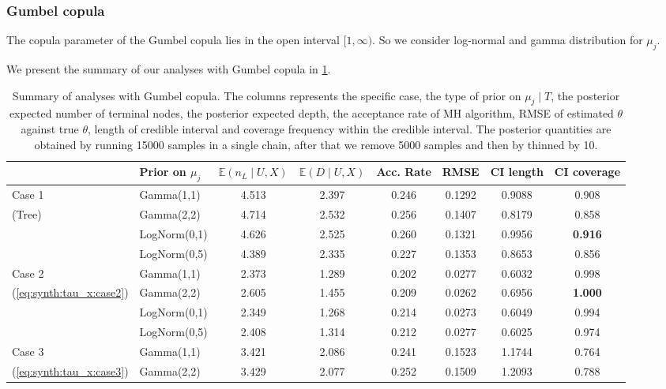 \documentclass{amsart}
\begin{document}
\subsubsection{Gumbel copula} The copula parameter of the Gumbel copula lies in the open interval $[1,\infty)$. So we consider log-normal and gamma distribution for $\mu_j$.

We present the summary of our analyses with Gumbel copula in \cref{tab:gumbel:summary}. 


\begin{table}[ht]
	\centering
	\caption{Summary of analyses with Gumbel copula. The columns represents the specific case, the type of prior on $\mu_j\mid T$, the posterior expected number of terminal nodes, the posterior expected depth, the acceptance rate of MH algorithm, RMSE of estimated $\theta$ against true $\theta$, length of credible interval and coverage frequency within the credible interval. The posterior quantities are obtained by running 15000 samples in a single chain, after that we remove 5000 samples and then by thinned by 10.}
	\label{tab:gumbel:summary}
	\scriptsize{
	\begin{tabular}{ll|cccccc}
		\toprule
		& Prior on $\mu_j$ & $\mathbb{E}(n_L\mid U,X)$ & $\mathbb{E}(D\mid U,X)$ & Acc. Rate & RMSE & CI length & CI coverage \\ 
		\hline
		Case 1 & Gamma(1,1) & 4.513 & 2.397 & 0.246 & 0.1292 & 0.9088 & 0.908 \\ 
		(Tree) & Gamma(2,2) & 4.714 & 2.532 & 0.256 & 0.1407 & 0.8179 & 0.858 \\ 
		& LogNorm(0,1) & 4.626 & 2.525 & 0.260 & 0.1321 & 0.9956 & \textbf{0.916} \\ 
		& LogNorm(0,5) & 4.389 & 2.335 & 0.227 & 0.1353 & 0.8653 & 0.856 \\ 
		\midrule
		Case 2 & Gamma(1,1) & 2.373 & 1.289 & 0.202 & 0.0277 & 0.6032 & 0.998 \\ 
		(\cref{eq:synth:tau_x:case2}) & Gamma(2,2) & 2.605 & 1.455 & 0.209 & 0.0262 & 0.6956 & \textbf{1.000} \\ 
		& LogNorm(0,1) & 2.349 & 1.268 & 0.214 & 0.0273 & 0.6049 & 0.994 \\ 
		& LogNorm(0,5) & 2.408 & 1.314 & 0.212 & 0.0277 & 0.6025 & 0.974 \\ 
		\midrule
		Case 3 & Gamma(1,1) & 3.421 & 2.086 & 0.241 & 0.1523 & 1.1744 & 0.764 \\ 
		(\cref{eq:synth:tau_x:case3}) & Gamma(2,2) & 3.429 & 2.077 & 0.252 & 0.1509 & 1.2093 & 0.788 \\ 

\end{tabular}}
\end{table}
\end{document}
